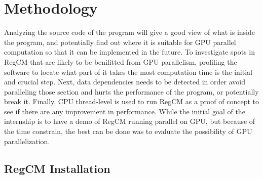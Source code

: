 \chapter{Methodology}

Analyzing the source code of the program will give a good view of what is inside the program, and potentially find out where it is suitable for GPU parallel computation so that it can be implemented in the future. To investigate spots in RegCM that are likely to be benifitted from GPU parallelism, profiling the software to locate what part of it takes the most computation time is the initial and crucial step. Next, data dependencies needs to be detected in order avoid paralleling those section and hurts the performance of the program, or potentially break it. Finally, CPU thread-level is used to run RegCM as a proof of concept to see if there are any improvement in performance. While the initial goal of the internship is to have a demo of RegCM running parallel on GPU, but because of the time constrain, the best can be done was to evaluate the possibility of GPU parallelization. \\

\section{RegCM Installation}

